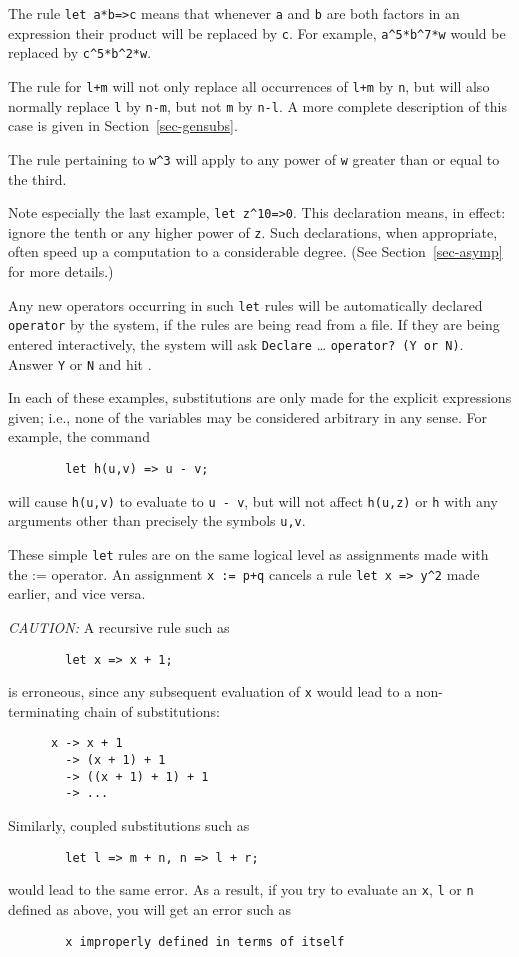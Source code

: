 The rule \texttt{let a*b=>c} means that whenever \texttt{a} and \texttt{b} are both
factors in an expression their product will be replaced by \texttt{c}.  For
example, \texttt{a\textasciicircum5*b\textasciicircum7*w} would be replaced by
\texttt{c\textasciicircum5*b\textasciicircum2*w}.

The rule for \texttt{l+m} will not only replace all occurrences of \texttt{l+m}
by \texttt{n}, but will also normally replace \texttt{l} by \texttt{n-m}, but not
\texttt{m} by \texttt{n-l}.  A more complete description of this case is given
in Section~\ref{sec-gensubs}.

The rule pertaining to \texttt{w\textasciicircum3} will apply to any power of \texttt{w}
greater than or equal to the third.

Note especially the last example, \texttt{let z\textasciicircum10=>0}.  This declaration
means, in effect: ignore the tenth or any higher power of \texttt{z}.  Such
declarations, when appropriate, often speed up a computation to a
considerable degree. (See
Section~\ref{sec-asymp} for more details.)

Any new operators occurring in such \texttt{let} rules will be automatically
declared \texttt{operator} by the system, if the rules are being read from a
file.  If they are being entered interactively, the system will ask
\texttt{Declare} \ldots{} \texttt{operator? (Y or N)}.  Answer \texttt{Y} or \texttt{N} and hit
.

In each of these examples, substitutions are only made for the explicit
expressions given; i.e., none of the variables may be considered arbitrary
in any sense. For example, the command
\begin{verbatim}
        let h(u,v) => u - v;
\end{verbatim}
will cause \texttt{h(u,v)} to evaluate to \texttt{u - v}, but will not affect
\texttt{h(u,z)} or \texttt{h} with any arguments other than precisely the
symbols \texttt{u,v}.

These simple \texttt{let} rules are on the same logical level as assignments
made with the := operator.  An assignment \texttt{x := p+q} cancels a rule
\texttt{let x => y\textasciicircum2} made earlier, and vice versa.

\textit{CAUTION:} A recursive rule such as
\begin{verbatim}
        let x => x + 1;
\end{verbatim}
is erroneous, since any subsequent evaluation of \texttt{x} would lead to a
non-terminating chain of substitutions:
\begin{verbatim}
      x -> x + 1
        -> (x + 1) + 1
        -> ((x + 1) + 1) + 1
        -> ...
\end{verbatim}
Similarly, coupled substitutions such as
\begin{verbatim}
        let l => m + n, n => l + r;
\end{verbatim}
would lead to the same error. As a result, if you try to evaluate an \texttt{x},
\texttt{l} or \texttt{n} defined as above, you will get an error such as
\begin{verbatim}
        x improperly defined in terms of itself
\end{verbatim}

